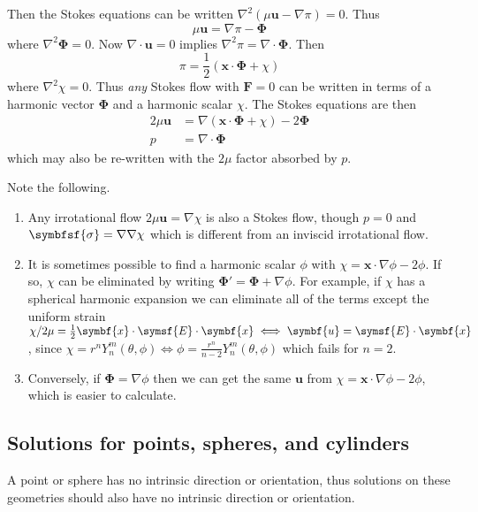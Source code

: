 \documentclass{jknotes}
\begin{document}
Then the Stokes equations can be written $\nabla^2 \left( \mu \symbf{u} - \nabla
\pi\right) = 0$. Thus
\begin{equation}
	\mu \symbf{u} = \nabla \pi - \symbf{\Phi}
\end{equation}
where $\nabla^2 \symbf{\Phi} = 0$. Now $\nabla \cdot \symbf{u} = 0$ implies
$\nabla^2 \pi = \nabla \cdot \symbf{\Phi}$. Then
\begin{equation}
	\pi = \frac{1}{2}\left(\symbf{x}\cdot\symbf{\Phi} + \chi\right)
\end{equation}
where $\nabla^2 \chi = 0$. Thus \emph{any} Stokes flow with $\symbf{F} = 0$ can
be written in terms of a harmonic vector $\symbf{\Phi}$ and a harmonic scalar
$\chi$. The Stokes equations are then
\begin{equation}
	\begin{aligned}
		2\mu \symbf{u} &= \nabla \left(\symbf{x} \cdot \symbf{\Phi} + \chi\right) -
	2\symbf{\Phi} \\
	p &= \nabla \cdot \symbf{\Phi}
\end{aligned}
\end{equation}
which may also be re-written with the $2\mu$ factor absorbed by $p$.

Note the following.
\begin{enumerate}
	\item Any irrotational flow $2 \mu \symbf{u} = \nabla \chi$ is also a Stokes
		flow, though $p = 0$ and $\symbfsf{\sigma} = \nabla \nabla \chi$ which
		is different from an inviscid irrotational flow.
	\item It is sometimes possible to find a harmonic scalar $\phi$ with
		$\chi = \symbf{x} \cdot \nabla \phi - 2 \phi$. If so, $\chi$ can be
		eliminated by writing $\symbf{\Phi}' = \symbf{\Phi} + \nabla \phi$. For
		example, if $\chi$ has a spherical harmonic expansion we can eliminate
		all of the terms except the uniform strain $\chi/2\mu = \frac{1}{2}
		\symbf{x} \cdot \symsf{E} \cdot \symbf{x} \iff \symbf{u} = \symsf{E} \cdot
		\symbf{x}$, since $\chi = r^n Y_n^m(\theta,\phi) \iff \phi =
		\frac{r^n}{n-2} Y_n^m(\theta,\phi)$ which fails for $n=2$.
	\item Conversely, if $\symbf{\Phi} = \nabla \phi$ then we can get the same
		$\symbf{u}$ from $\chi = \symbf{x} \cdot \nabla \phi - 2\phi$, which is
		easier to calculate.
\end{enumerate}

\subsection{Solutions for points, spheres, and cylinders}
A point or sphere has no intrinsic direction or orientation, thus solutions on
these geometries should also have no intrinsic direction or orientation.
\end{document}
